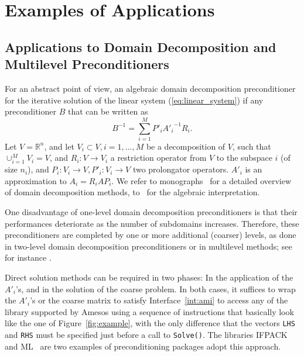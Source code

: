 \documentclass[acmtocl]{acmtrans2m}
\begin{document}
\section{Examples of Applications}
\label{sec:example}

\subsection{Applications to Domain Decomposition and Multilevel Preconditioners}
\label{sec:preconditioner}

For an abstract point of view, an algebraic domain decomposition
preconditioner for the iterative solution of the linear system
(\ref{eq:linear_system})
if any preconditioner $B$ that can be written as
\begin{equation}
\label{eq:prec}
B^{-1} = \sum_{i=1}^M P'_i {A'_i}^{-1} R_i.
\end{equation}
Let $V = \mathbb{R}^n$, and
let $V_i \subset V, i = 1, \ldots, M$ be a decomposition of $V$, such that
$\cup_{i=1}^M V_i = V$, and $R_i: V \rightarrow V_i$ a restriction operator
from $V$ to the subspace $i$ (of size $n_i$),
and $P_i: V_i \rightarrow V, P'_i : V_i \rightarrow V$ two prolongator
operators. $A'_i$ is an approximation to $A_i = R_i A P_i$.  We refer to 
monographs~\cite{QV2,smith96parallel} for a detailed
overview of domain decomposition methods, to~\cite{saad96iterative} for the
algebraic interpretation.

One disadvantage of one-level domain decomposition preconditioners is that
their performances deteriorate as the number of subdomains increases.
Therefore, these preconditioners are completed by one or more additional
(coarser) levels, as done in two-level domain decomposition preconditioners or
in multilevel methods; 
see for instance \cite{brandt.classic,hack.book,hack2.book}. 

Direct solution methods can be required in two phases: In the application of
the $A'_i$'s, and in the solution of the coarse problem. In both cases, it
suffices to wrap the $A'_i$'s or the coarse matrix to satisfy
Interface~\ref{int:ami} to access any of the library supported by Amesos using
a sequence of instructions that
basically look like the one of Figure~\ref{fig:example}, with the only
difference
that the vectors \verb!LHS! and \verb!RHS! must be specified just before a
call to \verb!Solve()!.  The libraries
IFPACK~\cite{ifpack-guide} and ML~\cite{ml-guide} are two examples of
preconditioning packages adopt this approach.
\end{document}
